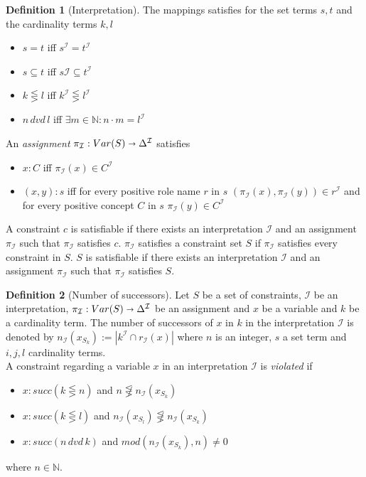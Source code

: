 \documentclass[a4paper,11pt]{scrartcl}
\theoremstyle{break}
\theoremstyle{definition}
\newtheorem{mydef}{Definition}
\begin{document}
\begin{mydef}[Interpretation]
The mappings satisfies for the set terms $s,t$ and the cardinality terms $k,l$
\begin{itemize}
\item $s=t$ iff $s^\mathcal{I}=t^\mathcal{I}$
\item $s\subseteq t$ iff $s\mathcal{I}\subseteq t^\mathcal{I}$
\item $k\lesseqgtr l$ iff $k^\mathcal{I}\lesseqgtr l^\mathcal{I}$
\item $n\,dvd\,l$ iff $\exists m\in\mathbb{N}:n\cdot m = l^\mathcal{I}$
\end{itemize}
An \textit{assignment} $\pi_\mathcal{I}: Var(S)\shortrightarrow \Delta^\mathcal{I}$ satisfies 
\begin{itemize}
\item $x:C$ iff $\pi_\mathcal{I}(x)\in C^\mathcal{I}$ 
\item $(x,y):s$ iff for every positive role name $r$ in $s$ $(\pi_\mathcal{I}(x),\pi_\mathcal{I}(y))\in r^\mathcal{I}$ and for every positive concept $C$ in $s$ $\pi_\mathcal{I}(y)\in C^\mathcal{I}$
\end{itemize} 
A constraint $c$ is satisfiable if there exists an interpretation $\mathcal{I}$ and an assignment $\pi_\mathcal{I}$ such that $\pi_\mathcal{I}$ satisfies $c$. $\pi_\mathcal{I}$ satisfies a constraint set $S$ if $\pi_\mathcal{I}$ satisfies every constraint in $S$. $S$ is satisfiable if there exists an interpretation $\mathcal{I}$ and an assignment $\pi_\mathcal{I}$ such that $\pi_\mathcal{I}$ satisfies $S$.
\end{mydef}
\begin{mydef}[Number of successors]
Let $S$ be a set of constraints, $\mathcal{I}$ be an interpretation, $\pi_\mathcal{I}:Var(S)\shortrightarrow \Delta^\mathcal{I}$ be an assignment and $x$ be a variable and $k$ be a cardinality term. The number of successors of $x$ in $k$ in the interpretation $\mathcal{I}$ is denoted by $n_\mathcal{I}(x_{S_k}):=|k^\mathcal{I}\cap r_\mathcal{I}(x)|$
where $n$ is an integer, $s$ a set term and $i,j,l$ cardinality terms.\\
A constraint regarding a variable $x$ in an interpretation $\mathcal{I}$ is \textit{violated} if
\begin{itemize}
\item $x:succ(k\lesseqgtr n)$ and $n\not\lesseqgtr n_\mathcal{I}(x_{S_k})$
\item $x:succ(k\lesseqgtr l)$ and $n_\mathcal{I}(x_{S_l})\not\lesseqgtr n_\mathcal{I}(x_{S_k})$
\item $x:succ(n\,dvd\,k)$ and $mod(n_\mathcal{I}(x_{S_k}),n)\neq 0$
\end{itemize} 
where $n\in\mathbb{N}$.
\end{mydef}
\end{document}
